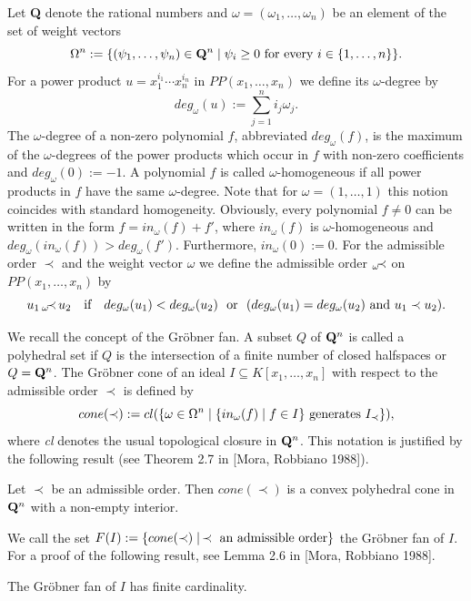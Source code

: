 Let {\bf Q} denote the rational numbers and 
$\omega = (\omega_1, \ldots,\omega_n)$ be an element of the set of 
weight vectors 
\[ \Omega^n:=\{(\psi_1,\ldots,\psi_n)\in{\bf Q}^n\mid  \psi_i\geq 0 \hbox{ for every }
i\in\{1,\ldots,n\}\}. \]
For a power product $u=x_1^{i_1}\cdots x_n^{i_n}$ in 
$PP(x_1,\ldots,x_n)$ we define
its $\omega$-degree by
\[ deg_{\omega}(u):=\sum_{j=1}^n i_j \omega_j. \]
The $\omega$-degree of a non-zero polynomial $f$, abbreviated $deg_{\omega}(f)$, 
is the maximum of the $\omega$-degrees of the power products which occur in $f$ with
non-zero coefficients and $deg_{\omega}(0):=-1$. 
A polynomial $f$ is called $\omega$-homogeneous
if all power products in $f$ have the same $\omega$-degree. 
Note that for $\omega =(1,\ldots,1)$ this notion coincides with standard 
homogeneity.
Obviously, every polynomial $f\not= 0$
can be written in the form $f=in_{\omega}(f)+f'$, where 
$in_{\omega}(f)$ is $\omega$-homogeneous and 
$deg_{\omega}(in_{\omega}(f))>deg_{\omega}(f')$. Furthermore, $in_{\omega}(0):=0$.
For the admissible order $\prec$ and
the weight vector $\omega$
we define the admissible order $_\omega\kern-5pt\prec$ on 
$PP(x_1,\ldots,x_n)$ by
\[ u_1 \,{_\omega\kern-5pt\prec}\, u_2 \ \ \hbox{ if }\ \ 
deg_{\omega}(u_1)<deg_{\omega}(u_2)\ \hbox{ or }\ 
(deg_{\omega}(u_1)=deg_{\omega}(u_2)
\hbox{ and } u_1\prec  u_2). \]

\medskip
We recall the concept of the Gr\"obner fan.
A subset $Q$ of ${\bf Q}^n$ is called a polyhedral set if $Q$ is the 
intersection of
a finite number of closed halfspaces or $Q={\bf Q}^n$.
The Gr\"obner cone of an ideal $I\subseteq K[x_1,\ldots,x_n]$
with respect to the admissible order $\prec$ is defined by
\[ cone(\prec):=
cl(\{\omega\in\Omega^n\mid \{in_{\omega}(f)\mid f\in I\} \hbox{ generates }
I_{\prec}\}), \]
where {\em cl} denotes the usual topological closure in ${\bf Q}^n$. 
This notation
is justified by the following result (see Theorem 2.7 in [Mora, Robbiano 1988]).

\medskip
\begin{theorem}
Let $\prec$ be an admissible order. Then $cone(\prec)$ is 
a convex polyhedral cone in ${\bf Q}^n$ 
with a non-empty interior.
\end{theorem}

\medskip
We call the set $F(I):=\{cone(\prec)\mid\, \prec \hbox{ an admissible order}\}$
the Gr\"obner fan of $I$. For a proof of the following result, 
see Lemma 2.6
in [Mora, Robbiano 1988].

\medskip
\begin{theorem}
The Gr\"obner fan of $I$ has finite cardinality.
\end{theorem}

